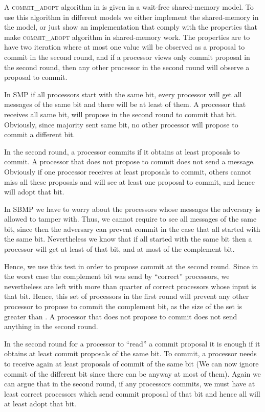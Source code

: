 \documentclass[11pt]{article}
\newcommand{\SMPfm}{\mbox{SMP\!}\xspace}
\newcommand{\SBMPfm}{\mbox{SBMP\!}\xspace}
\newcommand{\ca}{{\small\textsc{commit\!\_adopt}}\xspace}
\begin{document}
A \ca algorithm in \cite{Gafni98} is given in a wait-free shared-memory model.
To use this algorithm in different models we either implement the shared-memory in the model, or just show an implementation that 
comply with the properties that make \ca algorithm in shared-memory work.
The properties are to have two iteration where at most one value will be observed as a proposal to commit
in the second round, and if a processor views only commit proposal in the second round, then any
other processor in the second round will observe a proposal to commit.

In \SMPfm if all processors start with the same bit, every processor will get all messages of the same bit and there will be at least  of them.
A processor that receives all same bit, will propose in the second round to commit that bit.
Obviously, since majority sent same bit, no other processor will propose to commit a different bit.
 
In the second round, a processor commits if it obtains at least  proposals to commit.
A processor that does not propose to commit does not send a message.
Obviously if one processor receives  at least  proposals to commit, others cannot miss all these proposals and will see at least one proposal to commit,
and hence will adopt that bit.

In \SBMPfm we have to worry about the  processors  whose messages the adversary is allowed to tamper with.
Thus, we cannot require to see all messages of the same bit, since then the adversary can prevent commit in the case
that all started with the same bit. Nevertheless we know that if all started with the same bit then a processor will get 
at least  of that bit, and at most  of the complement bit.

Hence, we use this test in order to propose commit at the second round. Since in the worst case the complement bit
was send by ``correct'' processors, we nevertheless are left with more than quarter of correct processors whose input is that bit.
Hence, this set of processors in the first round will prevent any other processor to propose to commit the complement bit, 
as the size of the set is greater than . A processor that does not propose to commit does not send anything in the second round.

In the second round for a processor to ``read'' a commit proposal it is enough if it obtains at least  commit proposals of the same
bit. To commit, a processor needs to receive again at least  proposals of commit of the same bit (We can now ignore commit
of the different bit since there can be anyway at most  of them). 
Again we can argue that in the second round, if any processors commits, 
we must have at least  correct processors which send commit proposal of that bit and hence all will at least adopt that bit.
\end{document}
